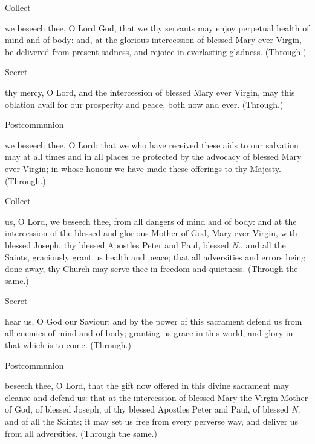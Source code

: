     
    \label{SPMaryInEaster}
   \begin{inhead}
   	Collect
   \end{inhead}
     we beseech thee, O Lord God, that we thy servants may enjoy perpetual health of mind and of body: and, at the glorious intercession of blessed Mary ever Virgin, be delivered from present sadness, and rejoice in everlasting gladness. (Through.)
  \begin{inhead}
  	Secret
  \end{inhead}
     thy mercy, O Lord, and the intercession of blessed Mary ever Virgin, may this oblation avail for our prosperity and peace, both now and ever. (Through.)
   \begin{inhead}
   	Postcommunion
   \end{inhead}
     we beseech thee, O Lord: that we who have received these aids to our salvation may at all times and in all places be protected by the advocacy of blessed Mary ever Virgin; in whose honour we have made these offerings to thy Majesty. (Through.)\\

    \label{SPSaints}
   \begin{inhead}
   	Collect
   \end{inhead}
     us, O Lord, we beseech thee, from all dangers of mind and of body: and at the intercession of the blessed and glorious Mother of God, Mary ever Virgin, with blessed Joseph, thy blessed Apostles Peter and Paul, blessed \emph{N.}, and all the Saints, graciously grant us health and peace; that all adversities and errors being done away, thy Church may serve thee in freedom and quietness. (Through the same.)
  \begin{inhead}
  	Secret
  \end{inhead}
     hear us, O God our Saviour: and by the power of this sacrament defend us from all enemies of mind and of body; granting us grace in this world, and glory in that which is to come. (Through.)
   \begin{inhead}
   	Postcommunion
   \end{inhead}
     beseech thee, O Lord, that the gift now offered in this divine sacrament may cleanse and defend us: that at the intercession of blessed Mary the Virgin Mother of God, of blessed Joseph, of thy blessed Apostles Peter and Paul, of blessed \emph{N.} and of all the Saints; it may set us free from every perverse way, and deliver us from all adversities. (Through the same.)
    
